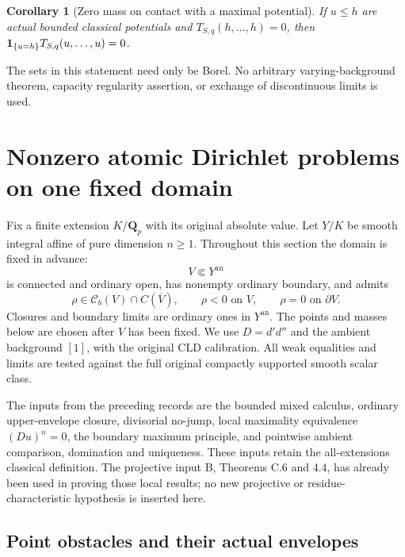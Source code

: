 \documentclass[11pt,a4paper]{article}
\numberwithin{equation}{section}
\newtheorem{corollary}[theorem]{Corollary}
\theoremstyle{definition}
\theoremstyle{remark}
\newcommand{\Cb}{\mathcal C_b}
\newcommand{\an}{\mathrm{an}}
\begin{document}
\begin{corollary}[Zero mass on contact with a maximal potential]
\label{cor:r3-relative-zero-contact-mass}
If $u\leq h$ are actual bounded classical potentials and
$T_{S,q}(h,\ldots,h)=0$, then
$ {\bf1}_{\{u=h\}}T_{S,q}(u,\ldots,u)=0$.
\end{corollary}

The sets in this statement need only be Borel. No arbitrary
varying-background theorem, capacity regularity assertion, or
exchange of discontinuous limits is used.



\section{Nonzero atomic Dirichlet problems on one fixed domain}
\label{sec:r3-nonzero-dirichlet}

Fix a finite extension $K/\mathbf Q_p$ with its original absolute
value. Let $Y/K$ be smooth integral affine of pure dimension $n\geq1$.
Throughout this section the domain is fixed in advance:
\[
 V\Subset Y^{\an}
\]
is connected and ordinary open, has nonempty ordinary boundary, and
admits
\[
 \rho\in\Cb(V)\cap C(\overline V),\qquad
 \rho<0\text{ on }V,\qquad \rho=0\text{ on }\partial V.
 \tag{H}\label{eq:r3-dirichlet-domain}
\]
Closures and boundary limits are ordinary ones in $Y^{\an}$.
The points and masses below are chosen after $V$ has been fixed.
We use $D=d'd''$ and the ambient background $[1]$, with the original
CLD calibration. All weak equalities and limits are tested against
the full original compactly supported smooth scalar class.

The inputs from the preceding records are the bounded mixed calculus,
ordinary upper-envelope closure, divisorial no-jump, local
maximality equivalence $(Du)^n=0$, the boundary maximum principle,
and pointwise ambient comparison, domination and uniqueness.
These inputs retain the all-extensions classical definition. The
projective input B, Theorems C.6 and 4.4, has already been used in
proving those local results; no new projective or residue-characteristic
hypothesis is inserted here.

\subsection{Point obstacles and their actual envelopes}
\end{document}

